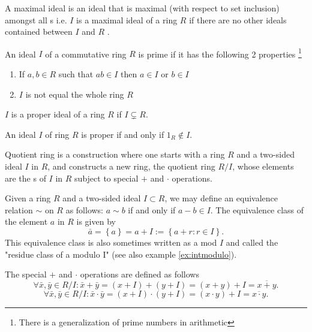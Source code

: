 \begin{appendices}
\begin{definition}
  A maximal ideal is an ideal that is maximal (with respect to set
  inclusion) amongst all s i.e.
  $I$ is a maximal ideal of a ring $R$ if there are no other ideals
  contained between $I$ and $R$ \cite{wiki:maxideal}.
\label{def:maxideal}
\end{definition}

\begin{definition}
  An ideal $I$ of a commutative ring $R$ is prime if it has the
  following 2 properties
  \footnote{
    There is a generalization of prime numbers in arithmetic
  }
  \begin{enumerate}
  \item If $a,b \in R$ such that $ab \in I$ then $a \in I$ or $b \in I$
  \item$I$ is not equal the whole ring $R$
  \end{enumerate}
  \label {def:primeideal}
\end{definition}

\begin{definition}
$I$ is a proper ideal of a ring $R$ if $I \subsetneq R$.
\label{def:properideal}
\end{definition}

\begin{theorem}
  An ideal $I$ of ring $R$ is proper if and only if $1_R \notin I$.
  \label{thm:properideal}
\end{theorem}

\begin{definition}
  Quotient ring is a construction where one
  starts with a ring $R$ and a two-sided ideal $I$ in $R$, and constructs a
  new ring, the quotient ring $R/I$, whose elements are the
  s of $I$ 
  in $R$ subject to special $+$ and $\cdot$ operations.

  Given a ring $R$ and a two-sided ideal $I \subset R$, we may define
  an equivalence relation $\sim$ on $R$ as follows: 
  $a \sim b$ if and only if $a - b \in I$.
  The equivalence class of the element $a$ in $R$ is given by
  \[
  \bar{a} = \left\{a\right\} = a + I := \left\{ a + r : r \in I \right\}.
  \]
  This equivalence class is also sometimes written as a mod $I$ and
  called the "residue class of a modulo I" (see also example
  \ref{ex:intmodulo}).

  The special $+$ and $\cdot$ operations are defined as follows
  \[
  \forall \bar{x},\bar{y} \in R/I:
  \bar{x} + \bar{y} = \left(x + I\right) + \left(y + I\right) =
  \left(x+y\right) + I = \overline{x+y}.
  \]
  \[
  \forall \bar{x},\bar{y} \in R/I:
  \bar{x} \cdot \bar{y} = \left(x + I\right) \cdot \left(y + I\right) =
  \left(x \cdot y\right) + I = \overline{x \cdot y}.
  \]


\end{definition}
\end{appendices}
